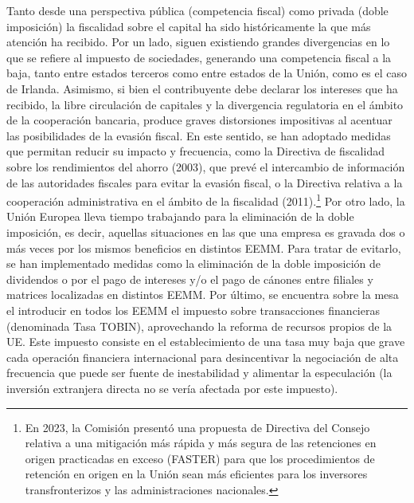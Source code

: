 \documentclass[10pt,a4paper]{article}
\begin{document}
Tanto desde una perspectiva pública (competencia fiscal) como privada (doble imposición) la fiscalidad sobre el capital ha sido históricamente la que más atención ha recibido. Por un lado, siguen existiendo grandes divergencias en lo que se refiere al impuesto de sociedades, generando una competencia fiscal a la baja, tanto entre estados terceros como entre estados de la Unión, como es el caso de Irlanda. Asimismo, si bien el contribuyente debe declarar los intereses que ha recibido, la libre circulación de capitales y la divergencia regulatoria en el ámbito de la cooperación bancaria, produce graves distorsiones impositivas al acentuar las posibilidades de la evasión fiscal. En este sentido, se han adoptado medidas que permitan reducir su impacto y frecuencia, como la Directiva de fiscalidad sobre los rendimientos del ahorro (2003), que prevé el intercambio de información de las autoridades fiscales para evitar la evasión fiscal, o la Directiva relativa a la cooperación administrativa en el ámbito de la fiscalidad (2011).\footnote{%
    En 2023, la Comisión presentó una propuesta de Directiva del Consejo relativa a una mitigación más rápida y más segura de las retenciones en origen practicadas en exceso (FASTER) para que los procedimientos de retención en origen en la Unión sean más eficientes para los inversores transfronterizos y las administraciones nacionales.
} Por otro lado, la Unión Europea lleva tiempo trabajando para la eliminación de la doble imposición, es decir, aquellas situaciones en las que una empresa es gravada dos o más veces por los mismos beneficios en distintos EEMM. Para tratar de evitarlo, se han implementado medidas como la eliminación de la doble imposición de dividendos o por el pago de intereses y/o el pago de cánones entre filiales y matrices localizadas en distintos EEMM. Por último, se encuentra sobre la mesa el introducir en todos los EEMM el impuesto sobre transacciones financieras (denominada Tasa TOBIN), aprovechando la reforma de recursos propios de la UE. Este impuesto consiste en el establecimiento de una tasa muy baja que grave cada operación financiera internacional para desincentivar la negociación de alta frecuencia que puede ser fuente de inestabilidad y alimentar la especulación (la inversión extranjera directa no se vería afectada por este impuesto).
\end{document}
